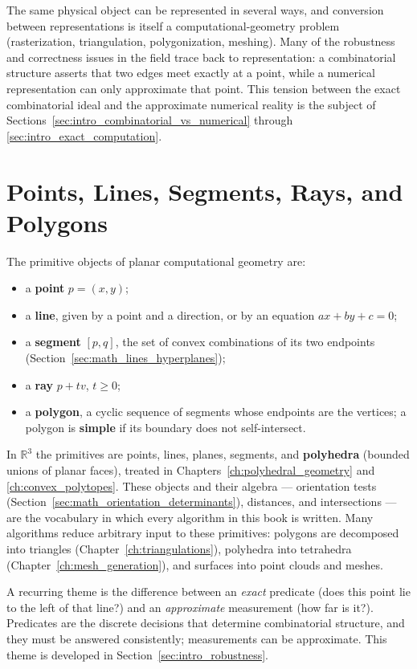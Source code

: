 The same physical object can be represented in several ways, and
conversion between representations is itself a computational-geometry
problem (rasterization, triangulation, polygonization, meshing). Many of
the robustness and correctness issues in the field trace back to
representation: a combinatorial structure asserts that two edges meet
exactly at a point, while a numerical representation can only approximate
that point. This tension between the exact combinatorial ideal and the
approximate numerical reality is the subject of
Sections~\ref{sec:intro_combinatorial_vs_numerical} through
\ref{sec:intro_exact_computation}.

\section{Points, Lines, Segments, Rays, and Polygons}
\label{sec:intro_primitives}

The primitive objects of planar computational geometry are:
\begin{itemize}
  \item a \textbf{point} $p = (x,y)$;
  \item a \textbf{line}, given by a point and a direction, or by an
    equation $ax + by + c = 0$;
  \item a \textbf{segment} $[p,q]$, the set of convex combinations of its
    two endpoints (Section~\ref{sec:math_lines_hyperplanes});
  \item a \textbf{ray} $p + tv$, $t\ge 0$;
  \item a \textbf{polygon}, a cyclic sequence of segments whose endpoints
    are the vertices; a polygon is \textbf{simple} if its boundary does not
    self-intersect.
\end{itemize}

In $\mathbb{R}^3$ the primitives are points, lines, planes, segments, and
\textbf{polyhedra} (bounded unions of planar faces), treated in
Chapters~\ref{ch:polyhedral_geometry} and \ref{ch:convex_polytopes}. These
objects and their algebra --- orientation tests
(Section~\ref{sec:math_orientation_determinants}), distances, and
intersections --- are the vocabulary in which every algorithm in this book
is written. Many algorithms reduce arbitrary input to these primitives:
polygons are decomposed into triangles (Chapter~\ref{ch:triangulations}),
polyhedra into tetrahedra (Chapter~\ref{ch:mesh_generation}), and surfaces
into point clouds and meshes.

A recurring theme is the difference between an \emph{exact} predicate
(does this point lie to the left of that line?) and an \emph{approximate}
measurement (how far is it?). Predicates are the discrete decisions that
determine combinatorial structure, and they must be answered consistently;
measurements can be approximate. This theme is developed in
Section~\ref{sec:intro_robustness}.

